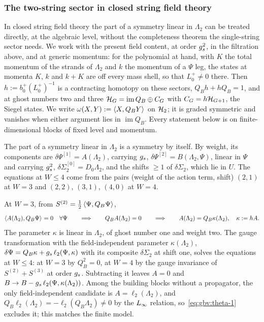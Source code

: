 \subsubsection{The two-string sector in closed string field theory}
\label{sec:gauge-bv:lambda2-sector}


In closed string field theory the part of a symmetry linear in $\Lambda_2$ can be treated directly, at the algebraic level, without the completeness theorem the single-string sector needs.
We work with the present field content, at order $g_s^2$, in the filtration above, and at generic momentum: for the polynomial at hand, with $K$ the total momentum of the strands of $\Lambda_2$ and $k$ the momentum of a $\Psi$ leg, the states at momenta $K$, $k$ and $k + K$ are off every mass shell, so that $L_0^+ \neq 0$ there.
Then $h := b_0^+ (L_0^+)^{-1}$ is a contracting homotopy on these sectors, $Q_B h + h Q_B = 1$, and at ghost numbers two and three $\mathcal{H}_G = \operatorname{im} Q_B \oplus C_G$ with $C_G = h \mathcal{H}_{G+1}$, the Siegel states.
We write $\omega(X, Y) := \braket{X, Q_B Y}_{}$ on $\mathcal{H}_2$; it is graded symmetric and vanishes when either argument lies in $\operatorname{im} Q_B$.
Every statement below is on finite-dimensional blocks of fixed level and momentum.

The part of a symmetry linear in $\Lambda_2$ is a symmetry by itself.
By weight, its components are $\delta \Psi^{[1]} = A(\Lambda_2)$, carrying $g_s$, $\delta \Psi^{[2]} = B(\Lambda_2, \Psi)$, linear in $\Psi$ and carrying $g_s^2$, $\delta \Sigma_2^{[0]} = D_0 \Lambda_2$, and the shifts $\ge 1$ of $\delta \Sigma_2$, which lie in $U$.
The equations at $W \le 4$ come from the pairs (weight of the action term, shift) $(2, 1)$ at $W = 3$ and $(2, 2)$, $(3, 1)$, $(4, 0)$ at $W = 4$.

At $W = 3$, from $S^{(2)} = \tfrac12 \braket{\Psi, Q_B \Psi}_{}$,
\begin{equation}
  \label{eq:gbv:theta-1}
  \braket{A(\Lambda_2), Q_B \Psi}_{}
    = 0
  \quad
  \forall \Psi
  \qquad
  \Longrightarrow
  \qquad
  Q_B A(\Lambda_2)
    = 0
  \qquad
  \Longrightarrow
  \qquad
  A(\Lambda_2)
    = Q_B \kappa(\Lambda_2),
  \quad
  \kappa
    := h A.
\end{equation}
The parameter $\kappa$ is linear in $\Lambda_2$, of ghost number one and weight two.
The gauge transformation with the field-independent parameter $\kappa(\Lambda_2)$, $\delta \Psi = Q_B \kappa + g_s \, \ell_2(\Psi, \kappa)$ with its composite $\delta \Sigma_2$ at shift one, solves the equations at $W \le 4$: at $W = 3$ by $Q_B^2 = 0$, at $W = 4$ by the gauge invariance of $S^{(2)} + S^{(3)}$ at order $g_s$.
Subtracting it leaves $A = 0$ and $B \to B - g_s \, \ell_2(\Psi, \kappa(\Lambda_2))$.
Among the building blocks without a propagator, the only field-independent candidate is $A = \ell_2(\Lambda_2)$, and $Q_B \ell_2(\Lambda_2) = - \ell_2(Q_B \Lambda_2) \neq 0$ by the $L_\infty$ relation, so~\eqref{eq:gbv:theta-1} excludes it; this matches the finite model.

